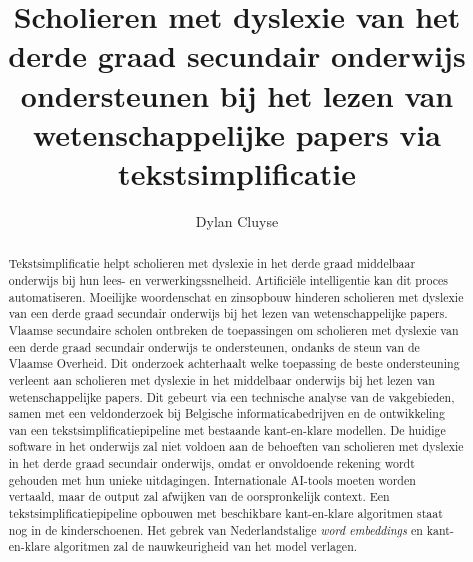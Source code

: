\documentclass{hogent-article}
\title{Scholieren met dyslexie van het derde graad secundair onderwijs ondersteunen bij het lezen van wetenschappelijke papers via tekstsimplificatie}
\author{Dylan Cluyse}
\begin{document}
\begin{abstract}
Tekstsimplificatie helpt scholieren met dyslexie in het derde graad middelbaar onderwijs bij hun lees- en verwerkingssnelheid. Artificiële intelligentie kan dit proces automatiseren. Moeilijke woordenschat en zinsopbouw hinderen scholieren met dyslexie van een derde graad secundair onderwijs bij het lezen van wetenschappelijke papers. Vlaamse secundaire scholen ontbreken de toepassingen om scholieren met dyslexie van een derde graad secundair onderwijs te ondersteunen, ondanks de steun van de Vlaamse Overheid. Dit onderzoek achterhaalt welke toepassing de beste ondersteuning verleent aan scholieren met dyslexie in het middelbaar onderwijs bij het lezen van wetenschappelijke papers. Dit gebeurt via een technische analyse van de vakgebieden, samen met een veldonderzoek bij Belgische informaticabedrijven en de ontwikkeling van een tekstsimplificatiepipeline met bestaande kant-en-klare modellen. De huidige software in het onderwijs zal niet voldoen aan de behoeften van scholieren met dyslexie in het derde graad secundair onderwijs, omdat er onvoldoende rekening wordt gehouden met hun unieke uitdagingen. Internationale AI-tools moeten worden vertaald, maar de output zal afwijken van de oorspronkelijk context. Een tekstsimplificatiepipeline opbouwen met beschikbare kant-en-klare algoritmen staat nog in de kinderschoenen. Het gebrek van Nederlandstalige \textit{word embeddings} en kant-en-klare algoritmen zal de nauwkeurigheid van het model verlagen.
\end{abstract}

\tableofcontents



\printbibliography[heading=bibintoc]
\end{document}
